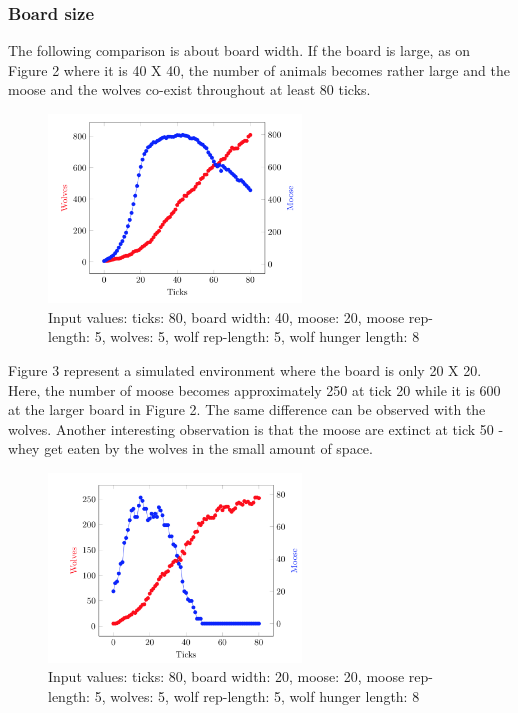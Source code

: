 \documentclass[a4paper]{report}
\begin{document}
\subsubsection*{Board size}
The following comparison is about board width. If the board is large, as on Figure 2 where it is 40 X 40, the number of animals becomes rather large and the moose and the wolves co-exist throughout at least 80 ticks. 

\begin{figure}[H]
\centering
\includegraphics[width=0.60\textwidth]{Experiments/sim_board_b1}
\caption{Input values: ticks: 80, board width: 40, moose: 20, moose rep-length: 5, wolves: 5, wolf rep-length: 5, wolf hunger length: 8}
\end{figure}

Figure 3 represent a simulated environment where the board is only 20 X 20. Here, the number of moose becomes approximately 250 at tick 20 while it is 600 at the larger board in Figure 2. The same difference can be observed with the wolves. Another interesting observation is that the moose are extinct at tick 50 - whey get eaten by the wolves in the small amount of space. 

\begin{figure}[H]
\centering
\includegraphics[width=0.60\textwidth]{Experiments/sim_board_b2} 
\caption{Input values: ticks: 80, board width: 20, moose: 20, moose rep-length: 5, wolves: 5, wolf rep-length: 5, wolf hunger length: 8}
\end{figure}
\end{document}
